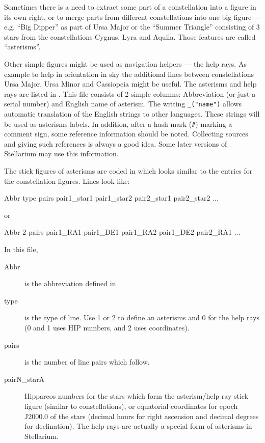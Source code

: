 \noindent{}Sometimes there is a need to extract some part of a 
constellation into a figure in its own right, or to merge parts from different 
constellations into one big figure --- e.g. ``Big Dipper'' as part of Ursa Major or the 
``Summer Triangle'' consisting of 3 stars from the constellations Cygnus, Lyra and Aquila. 
Those features are called ``asterisms''. 

Other simple figures might be used as navigation helpers --- the help rays. 
As example to help in orientation in sky the additional lines between constellations 
Ursa Major, Ursa Minor and Cassiopeia might be useful. The asterisms and help rays are listed in
. This file consists of 2 simple columns:
Abbreviation (or just a serial number) and English
name of asterism. The writing \texttt{\_("name")} allows automatic
translation of the English strings to other languages. These strings
will be used as asterisms labels. In addition, after a hash mark (\texttt{\#}) marking a comment sign, 
some reference information should be noted. Collecting sources and giving such references 
is always a good idea. Some later versions of Stellarium may use this information.

The stick figures of asterisms are coded in 
which looks similar to the entries for the constellation
figures. Lines look like:

\begin{configfile}
Abbr type pairs pair1_star1 pair1_star2 pair2_star1 pair2_star2 ...
\end{configfile}
or
\begin{configfile}
Abbr 2 pairs pair1_RA1 pair1_DE1 pair1_RA2 pair1_DE2 pair2_RA1 ...
\end{configfile}
In this file,
\begin{description}
\item[Abbr] is the abbreviation defined in 
\item[type] is the type of line. Use 1 or 2 to define an asterisms and 0 for the help rays (0 and 1 uses HIP numbers, and 2 uses coordinates).
\item[pairs] is the number of line pairs which follow.
\item[pairN\_starA] Hipparcos numbers for the stars which form the
  asterism/help ray stick figure (similar to constellations), or equatorial coordinates for epoch J2000.0 of the stars (decimal hours for right ascension and decimal degrees for declination). The help rays are actually a special form of asterisms in Stellarium. 
\end{description}

